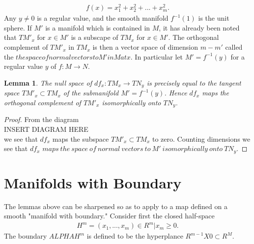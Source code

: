 \documentclass[12pt, openany, closeany]{book}
\newtheorem{lemma}{Lemma}
\theoremstyle{corollary}
\begin{document}
    \begin{align*}
      f(x) = x^2_{1} + x^2_{2} + ... + x^2_{m}.
    \end{align*}
    Any $y \neq 0$ is a regular value, and the smooth manifold $f^{-1}(1)$ is the unit sphere.
    If $M'$ is a manifold which is contained in $M$, it has already been noted that $TM'_{x}$ for $x\in M'$ is a subscape of $TM_{x}$ for $x\in M'$. The orthogonal complement of $TM'_{x}$ in $TM_{x}$ is then a vector space of dimension $m - m'$ called the $the space of normal vectors to M' in M at x$.
    In particular let $M' = f^{-1}(y)$ for a regular value $y$ of $f: M \to N$.
    \newpage
  \begin{lemma} The null space of $df_{x} : TM_{x} \to TN_{y}$ is precisely equal to the tangent space $TM'_{x} \subset TM_{x}$ of the submanifold $M' = f^{-1}(y)$. Hence $df_{x}$ maps the orthogonal complement of $TM'_{x}$ isomorphically onto $TN_{y}$.

  \end{lemma}
  \begin{proof} From the diagram \\
    INSERT DIAGRAM HERE \\
  we see that $df_{x}$ maps the subspace $TM'_{x} \subset TM_{x}$ to zero. Counting dimensions we see that $df_{x}$ $maps\ the\ space\ of\ normal\ vectors\ to\ M'\ isomorphically\ onto\ TN_{y}$.
  \end{proof}
  \section{Manifolds with Boundary}
  The lemmas above can be sharpened so as to apply to a map defined on a smooth "manifold with boundary." Consider first the closed half-space
  \begin{align*}
    H^m = {(x_{1}, ..., x_{m})\in R^m | x_{m}\geq 0}.
  \end{align*}
  The boundary $ALPHAH^m$ is defined to be the hyperplance $R^{m-1} X 0 \subset R^M$.
\end{document}
